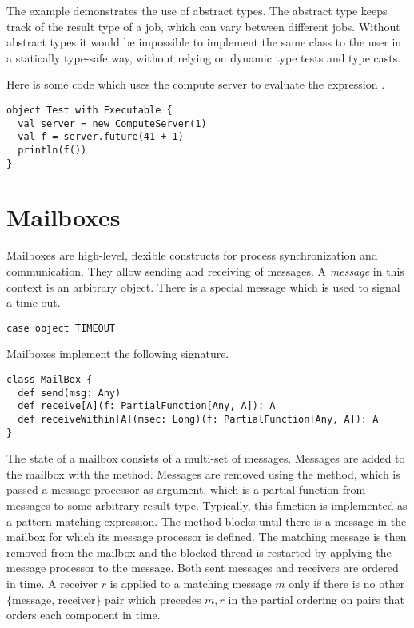 The example demonstrates the use of abstract types. The abstract type
 keeps track of the result type of a job, which can vary
between different jobs. Without abstract types it would be impossible
to implement the same class to the user in a statically type-safe
way, without relying on dynamic type tests and type casts.


Here is some code which uses the compute server to evaluate 
the expression .
\begin{lstlisting}
object Test with Executable {
  val server = new ComputeServer(1)
  val f = server.future(41 + 1)
  println(f())
}
\end{lstlisting}

\section{Mailboxes}
\label{sec:mailbox}

Mailboxes are high-level, flexible constructs for process
synchronization and communication. They allow sending and receiving of
messages. A {\em message} in this context is an arbitrary object.
There is a special message  which is used to signal a
time-out.
\begin{lstlisting}
case object TIMEOUT
\end{lstlisting}
Mailboxes implement the following signature.
\begin{lstlisting}
class MailBox {
  def send(msg: Any)
  def receive[A](f: PartialFunction[Any, A]): A
  def receiveWithin[A](msec: Long)(f: PartialFunction[Any, A]): A
}
\end{lstlisting}
The state of a mailbox consists of a multi-set of messages.
Messages are added to the mailbox with the  method. Messages
are removed using the  method, which is passed a message
processor  as argument, which is a partial function from
messages to some arbitrary result type. Typically, this function is
implemented as a pattern matching expression. The 
method blocks until there is a message in the mailbox for which its
message processor is defined.  The matching message is then removed
from the mailbox and the blocked thread is restarted by applying the
message processor to the message. Both sent messages and receivers are
ordered in time. A receiver $r$ is applied to a matching message $m$
only if there is no other $\{$message, receiver$\}$ pair which precedes ${m,
r}$ in the partial ordering on pairs that orders each component in
time.

